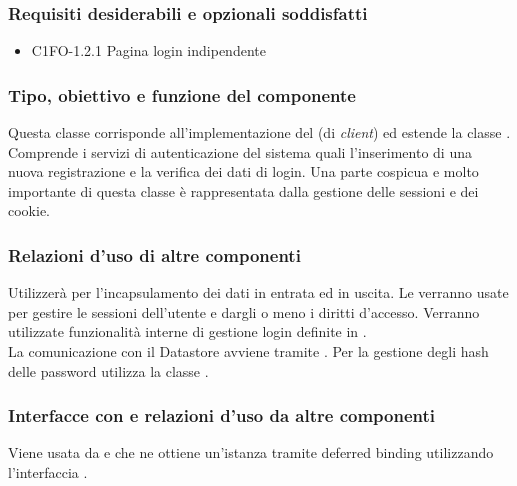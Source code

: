 \subsubsection*{Requisiti desiderabili e opzionali soddisfatti}
\begin{itemize}
    \item C1FO-1.2.1 Pagina login indipendente
\end{itemize}
\subsubsection*{Tipo, obiettivo e funzione del componente}
Questa classe corrisponde all'implementazione del  (di
\emph{client}) ed estende la classe . Comprende i
servizi di autenticazione del sistema quali l'inserimento di una nuova
registrazione e la verifica dei dati di login. Una parte cospicua e molto
importante di questa classe \`e rappresentata dalla gestione delle sessioni e
dei cookie. 
\subsubsection*{Relazioni d'uso di altre componenti} Utilizzer\`a 
per l'incapsulamento dei dati in entrata ed in uscita. Le
 verranno
usate per gestire le sessioni dell'utente e dargli o meno i diritti d'accesso.
Verranno utilizzate funzionalit\`a interne di gestione login definite in
. \\ La comunicazione con il Datastore avviene tramite
. Per la gestione degli hash delle password utilizza la classe
. 
\subsubsection*{Interfacce con e relazioni d'uso da altre
componenti} Viene usata da  e  che ne ottiene un'istanza
tramite deferred binding utilizzando l'interfaccia .
